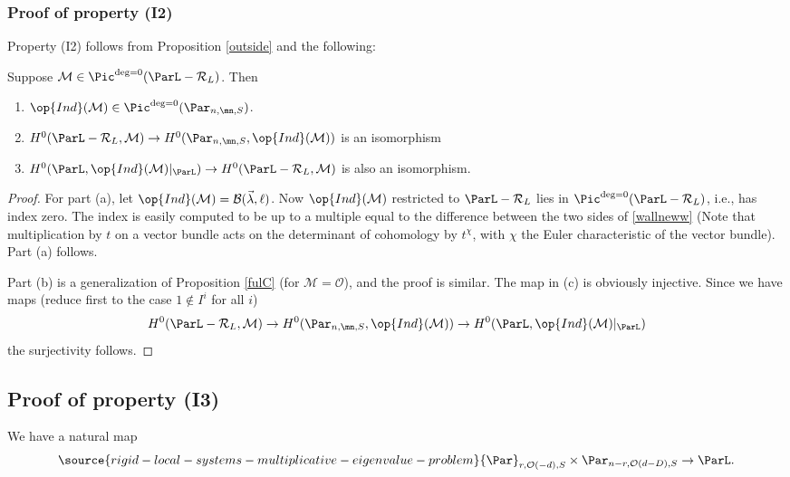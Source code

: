 \subsubsection{Proof of property (I2)}
Property (I2) follows from Proposition \ref{outside} and  the following:
\begin{proposition}
\notready\label{uselater}
Suppose $\mathcal{M}\in \Pic^{\deg=0}(\ParL-\mathcal{R}_L)$. Then
\begin{enumerate}
\item[(a)] $\op{Ind}(\mathcal{M})\in \Pic^{\deg=0}(\Par_{n,\mn,S})$.
\item[(b)] $H^0(\ParL-\mathcal{R}_L,\mathcal{M})\to H^0(\Par_{n,\mn,S},\op{Ind}(\mathcal{M}))$ is an isomorphism
\item[(c)] $H^0(\ParL,\op{Ind}(\mathcal{M})|_{\ParL})\to H^0(\ParL -\mathcal{R}_L,\mathcal{M})$ is also an isomorphism.
\end{enumerate}
\end{proposition}
\begin{proof}
For part (a), let $\op{Ind}(\mathcal{M})=\mathcal{B}(\vec{\lambda},\ell)$. Now $\op{Ind}(\mathcal{M})$ restricted to $\ParL-\mathcal{R}_L$ lies in  $\Pic^{\deg=0}(\ParL-\mathcal{R}_L)$, i.e., has index zero.
The index is easily computed to be  up to a multiple equal to the difference between the two sides of \eqref{wallneww} (Note that multiplication by $t$ on a vector bundle acts on the determinant of cohomology by $t^{\chi}$, with $\chi$ the Euler characteristic of the vector bundle).  Part (a)  follows.

Part (b) is a generalization of Proposition  \ref{fulC} (for $\mathcal{M}=\mathcal{O}$), and the proof is similar. The map in (c) is obviously injective. Since we have  maps (reduce first to the case $1\not\in I^i$ for all $i$)
$$ H^0(\ParL -\mathcal{R}_L,\mathcal{M})\to H^0(\Par_{n,\mn,S},\op{Ind}(\mathcal{M}))\to H^0(\ParL,\op{Ind}(\mathcal{M})|_{\ParL})$$
the surjectivity follows.
\end{proof}
\subsection{Proof of property (I3)}
We have a natural map
\begin{equation}\label{temper2}
\source{rigid-local-systems-multiplicative-eigenvalue-problem}
{\Par}_{r,\mathcal{O}(-d),S}\times {\Par}_{n-r,\mathcal{O}(d-D),S} \to  \ParL.
\end{equation}

